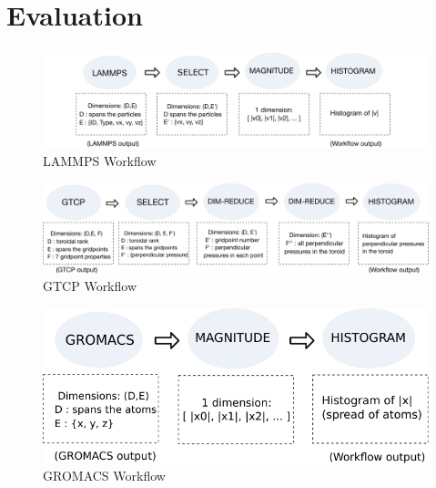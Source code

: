 \section{Evaluation}
\label{s:eval}

\begin{figure}
  \vspace{-0.10in}
  \includegraphics[width=\linewidth]{fig/wflow3}
  \vspace{-0.35in}
  \caption{LAMMPS Workflow}
  \label{fig:lammps-workflow}
  \vspace{-0.05in}
\end{figure}

\begin{figure}
  \includegraphics[width=\linewidth]{fig/wflow4}
  \vspace{-0.35in}
  \caption{GTCP Workflow}
  \label{fig:gtcp-workflow}
  \vspace{-0.15in}
\end{figure}

\begin{figure}
  \center
  \includegraphics[width=\columnwidth]{fig/wflow_gromacs}
  \vspace{-0.25in}
  \caption{GROMACS Workflow}
  \label{fig:gromacs-workflow}
  \vspace{-0.15in}
\end{figure}

